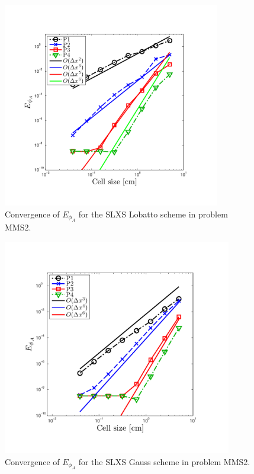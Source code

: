 \begin{figure}[!hbp]
\centering
\includegraphics[width=9.5cm,trim=0.25in  0.4in 0.75in 0.75in,clip=true]{chapter6_grey_radtran/Dissertation_Data/MMS3_SLXS_SLXS_Lobatto_phi_A.pdf}
\caption{Convergence of $E_{\phi_A}$ for the SLXS Lobatto scheme in problem MMS2.}
\label{fig:mms3_slxs_lobatto_phi_a}
\end{figure}
%
%
\begin{figure}[!htp]
\centering
\includegraphics[width=10cm,trim=0.25in  0.25in 0.75in 0.75in,clip=true]{chapter6_grey_radtran/Dissertation_Data/MMS3_SLXS_Gauss_phi_A.pdf}
\caption{Convergence of $E_{\phi_A}$ for the SLXS Gauss scheme in problem MMS2.}
\label{fig:mms3_slxs_gauss_phi_a}
\end{figure}
